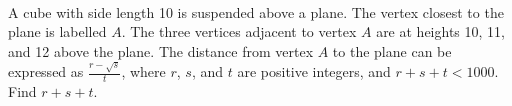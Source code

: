 \documentclass{article}
\begin{document}
\\
\begin{prob}[AIME I 2011/13]{13}
A cube with side length 10 is suspended above a plane. The vertex closest to the plane is labelled $A$. The three vertices adjacent to vertex $A$ are at heights 10, 11, and 12 above the plane. The distance from vertex $A$ to the plane can be expressed as $$, where $r$, $s$, and $t$ are positive integers, and $r+s+t<1000$. Find $r+s+t$.
\end{prob}
\end{document}

